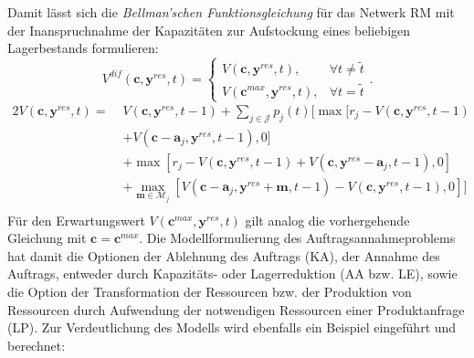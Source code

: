 Damit lässt sich die \textit{Bellman'schen Funktionsgleichung} für das Netwerk RM mit der Inanspruchnahme der Kapazitäten zur Aufstockung eines beliebigen Lagerbestands formulieren:
\begin{equation}\label{dif}
     V^{dif}(\textbf{c}, \textbf{y}^{res}, t)=\left\{\begin{array}{ll} V(\textbf{c}, \textbf{y}^{res}, t), & \forall t\neq\tilde{t}\\
         V(\textbf{c}^{max}, \textbf{y}^{res}, t), &\forall t=\tilde{t}\end{array}\right. .
\end{equation}
\begin{alignat*}{2}
 V(\textbf{c}, \textbf{y}^{res}, t) = \;& V(\textbf{c}, \textbf{y}^{res}, t-1)+ \sum_{j \in \mathcal{J}}p_{j}(t)[\max[r_{j} - V(\textbf{c}, \textbf{y}^{res}, t-1)\\
&+ V(\textbf{c}-\textbf{a}_j, \textbf{y}^{res}, t-1),0] \\
&+ \max[r_{j} - V(\textbf{c}, \textbf{y}^{res}, t-1) + V(\textbf{c}, \textbf{y}^{res}-\textbf{a}_j, t-1),0]\\
&+ \max_{\textbf{m}\in\mathcal{M}_{j}}[V(\textbf{c}-\textbf{a}_j, \textbf{y}^{res}+\textbf{m}, t-1) - V(\textbf{c}, \textbf{y}^{res}, t-1) ,0]]\\
\end{alignat*}
Für den Erwartungswert $V(\textbf{c}^{max}, \textbf{y}^{res}, t)$ gilt analog die vorhergehende Gleichung mit $\textbf{c}=\textbf{c}^{max}$. Die Modellformulierung des Auftragsannahmeproblems hat damit die Optionen der Ablehnung des Auftrags (KA), der Annahme des Auftrags, entweder durch Kapazitäts- oder Lagerreduktion (AA bzw. LE), sowie die Option der Transformation der Ressourcen bzw. der Produktion von Ressourcen durch Aufwendung der notwendigen Ressourcen einer Produktanfrage (LP). Zur Verdeutlichung des Modells wird ebenfalls ein Beispiel eingeführt und berechnet:

